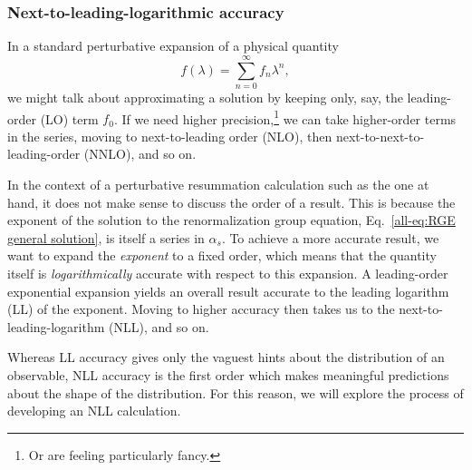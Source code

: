 \documentclass[../thesis.tex]{subfiles}
\begin{document}
\subsubsection{Next-to-leading-logarithmic accuracy}\label{all-sec:NLL resummation}
	In a standard perturbative expansion of a physical quantity
	\begin{equation}
		f(\lambda) = \sum_{n = 0}^\infty f_n \lambda^n,
	\end{equation}
	we might talk about approximating a solution by keeping only, say, the leading-order (LO) term $f_0$. If we need higher precision,\footnote{Or are feeling particularly fancy.} we can take higher-order terms in the series, moving to next-to-leading order (NLO), then next-to-next-to-leading-order (NNLO), and so on.

	In the context of a perturbative resummation calculation such as the one at hand, it does not make sense to discuss the order of a result. This is because the exponent of the solution to the renormalization group equation, Eq.~\ref{all-eq:RGE general solution}, is itself a series in $\alpha_s$. To achieve a more accurate result, we want to expand the \textit{exponent} to a fixed order, which means that the quantity itself is \textit{logarithmically} accurate with respect to this expansion. A leading-order exponential expansion yields an overall result accurate to the leading logarithm (LL) of the exponent. Moving to higher accuracy then takes us to the next-to-leading-logarithm (NLL), and so on.

	Whereas LL accuracy gives only the vaguest hints about the distribution of an observable, NLL accuracy is the first order which makes meaningful predictions about the shape of the distribution. For this reason, we will explore the process of developing an NLL calculation.
\end{document}
